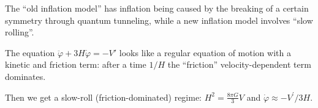 \documentclass[main.tex]{subfiles}
\begin{document}






The ``old inflation model'' has inflation being caused by the breaking of a certain symmetry through quantum tunneling, 
while a new inflation model involves ``slow rolling''.

The equation \(\ddot{\varphi } + 3 H \dot{\varphi } = - V'\) looks like a regular equation of motion with a kinetic and friction term: after a time \(1/H\) the ``friction'' velocity-dependent term dominates.

Then we get a slow-roll (friction-dominated) regime: \(H^2  = \frac{8 \pi G}{3} V \) and \(\dot{\varphi} \approx - V^{\prime }/3H\).





\end{document}
